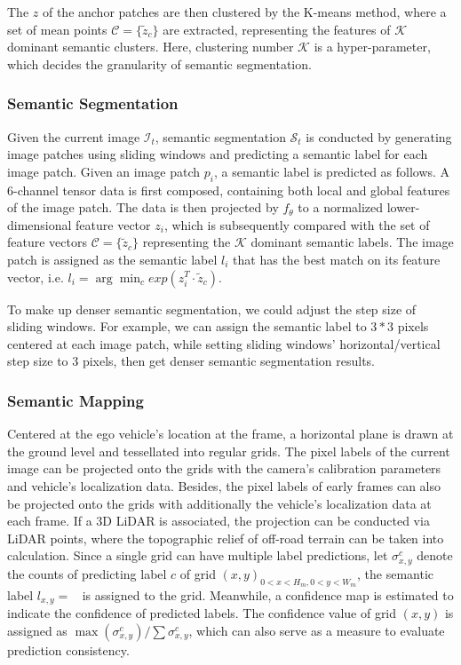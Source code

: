 \documentclass[letterpaper, 10 pt, conference]{ieeeconf}  %
\begin{document}
	The $z$ of the anchor patches are then clustered by the K-means method, where a set of mean points $\mathcal{C}=\{\tilde{z}_c\}$ are extracted, representing the features of $\mathcal{K}$ dominant semantic clusters. Here, clustering number $\mathcal{K}$ is a hyper-parameter, which decides the granularity of semantic segmentation.
	
	\subsubsection{Semantic Segmentation}
	
	Given the current image $\mathcal{I}_t$, semantic segmentation $\mathcal{S}_t$ is conducted by generating image patches using sliding windows and predicting a semantic label for each image patch.
	Given an image patch $p_i$, a semantic label is predicted as follows. A 6-channel tensor data is first composed, containing both local and global features of the image patch. The data is then projected by $f_{\theta}$ to a normalized lower-dimensional feature vector $z_i$, which is subsequently compared with the set of feature vectors $\mathcal{C}=\{\tilde{z}_c\}$ representing the $\mathcal{K}$ dominant semantic labels. The image patch is assigned as the semantic label $l_i$ that has the best match on its feature vector, i.e. $l_i = \arg\min_c exp(z_i^T \cdot \tilde{z}_c)$.
	
	To make up denser semantic segmentation, we could adjust the step size of sliding windows. For example, we can assign the semantic label to $3*3$ pixels centered at each image patch, while setting sliding windows' horizontal/vertical step size to 3 pixels, then get denser semantic segmentation results.
	
	\subsubsection{Semantic Mapping} \label{3_SM}
	
	Centered at the ego vehicle's location at the frame, a horizontal plane is drawn at the ground level and tessellated into regular grids.  
	The pixel labels of the current image can be projected onto the grids with the camera’s calibration parameters and vehicle's localization data.
	Besides, the pixel labels of early frames can also be projected onto the grids with additionally the vehicle's localization data at each frame.
	If a 3D LiDAR is associated, the projection can be conducted via LiDAR points, where the topographic relief of off-road terrain can be taken into calculation. 
	Since a single grid can have multiple label predictions, let $\sigma_{x,y}^c$ denote the counts of predicting label $c$ of grid $(x,y)_{0<x<H_m,0<y<W_m}$, the semantic label $l_{x,y}=\mathop{\text{argmax}_{c} (\sigma_{x,y}^c)}$ is assigned to the grid. Meanwhile, a confidence map is estimated to indicate the confidence of predicted labels. The confidence value of grid $(x,y)$ is assigned as $\max(\sigma_{x,y}^c)/\sum{\sigma_{x,y}^c}$, which can also serve as a measure to evaluate prediction consistency.
	
\end{document}
